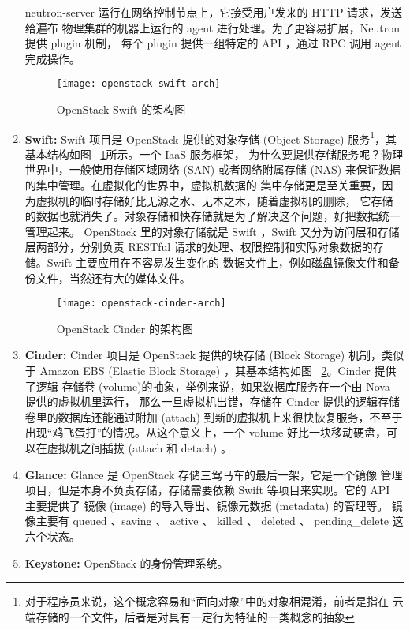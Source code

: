 \begin{enumerate}
     neutron-server 运行在网络控制节点上，它接受用户发来的 HTTP 请求，发送给遍布
    物理集群的机器上运行的 agent 进行处理。为了更容易扩展，Neutron 提供 plugin 机制，
    每个 plugin 提供一组特定的 API ，通过 RPC 调用 agent 完成操作。
    \begin{figure}[h]
        \centering
        \texttt{[image: openstack-swift-arch]}
        \caption{OpenStack Swift 的架构图}
        \label{fig:openstack-swift-arch}
    \end{figure}
    \item \textbf{Swift:} Swift 项目是 OpenStack 提供的对象存储 (Object Storage)
     服务\footnote{对于程序员来说，这个概念容易和“面向对象”中的对象相混淆，前者是指在
    云端存储的一个文件，后者是对具有一定行为特征的一类概念的抽象}，其基本结构如图
    ~\ref{fig:openstack-swift-arch}所示。一个 IaaS 服务框架，
    为什么要提供存储服务呢？物理世界中，一般使用存储区域网络
     (SAN) 或者网络附属存储 (NAS) 来保证数据的集中管理。在虚拟化的世界中，虚拟机数据的
    集中存储更是至关重要，因为虚拟机的临时存储好比无源之水、无本之木，随着虚拟机的删除，
    它存储的数据也就消失了。对象存储和快存储就是为了解决这个问题，好把数据统一管理起来。
    OpenStack 里的对象存储就是 Swift ，Swift 又分为访问层和存储层两部分，分别负责
    RESTful 请求的处理、权限控制和实际对象数据的存储。Swift 主要应用在不容易发生变化的
    数据文件上，例如磁盘镜像文件和备份文件，当然还有大的媒体文件。
    \begin{figure}[h]
        \centering
        \texttt{[image: openstack-cinder-arch]}
        \caption{OpenStack Cinder 的架构图}
        \label{fig:openstack-cinder-arch}
    \end{figure}
    \item \textbf{Cinder:} Cinder 项目是 OpenStack 提供的块存储 (Block Storage)
     机制，类似于 Amazon EBS (Elastic Block Storage) ，其基本结构如图
    ~\ref{fig:openstack-cinder-arch}。Cinder 提供了逻辑
    存储卷 (volume)的抽象，举例来说，如果数据库服务在一个由 Nova 提供的虚拟机里运行，
    那么一旦虚拟机出错，存储在 Cinder 提供的逻辑存储卷里的数据库还能通过附加 (attach)
     到新的虚拟机上来很快恢复服务，不至于出现“鸡飞蛋打”的情况。从这个意义上，一个 volume
     好比一块移动硬盘，可以在虚拟机之间插拔 (attach 和 detach) 。~\cite{cinder}
    \item \textbf{Glance:} Glance 是 OpenStack 存储三驾马车的最后一架，它是一个镜像
    管理项目，但是本身不负责存储，存储需要依赖 Swift 等项目来实现。它的 API 主要提供了
    镜像 (image) 的导入导出、镜像元数据 (metadata) 的管理等。
    镜像主要有 queued 、saving 、 active 、 killed 、
     deleted 、 pending\_delete 这六个状态。
    \item \textbf{Keystone:} OpenStack 的身份管理系统。
\end{enumerate}


